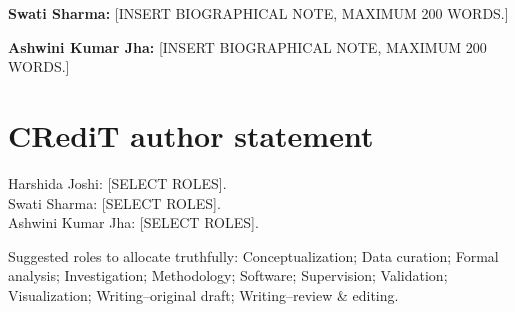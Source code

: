 \documentclass[11pt,a4paper]{article}
\begin{document}
\textbf{Swati Sharma:} [INSERT BIOGRAPHICAL NOTE, MAXIMUM 200 WORDS.]

\textbf{Ashwini Kumar Jha:} [INSERT BIOGRAPHICAL NOTE, MAXIMUM 200 WORDS.]

\section*{CRediT author statement}
Harshida Joshi: [SELECT ROLES].\\
Swati Sharma: [SELECT ROLES].\\
Ashwini Kumar Jha: [SELECT ROLES].

\noindent Suggested roles to allocate truthfully: Conceptualization; Data curation; Formal analysis;
Investigation; Methodology; Software; Supervision; Validation; Visualization; Writing--original
draft; Writing--review \& editing.
\end{document}
